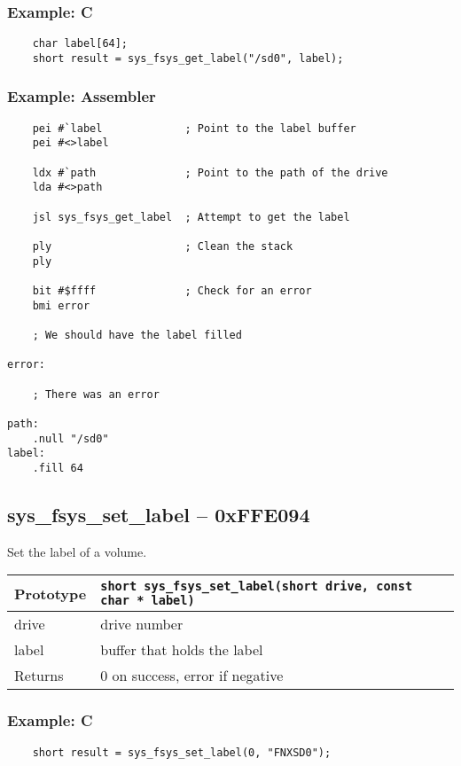\subsubsection*{Example: C}
\begin{lstlisting}
    char label[64];
    short result = sys_fsys_get_label("/sd0", label);
\end{lstlisting}

\subsubsection*{Example: Assembler}
\begin{verbatim}
    pei #`label             ; Point to the label buffer
    pei #<>label

    ldx #`path              ; Point to the path of the drive
    lda #<>path

    jsl sys_fsys_get_label  ; Attempt to get the label

    ply                     ; Clean the stack
    ply

    bit #$ffff              ; Check for an error
    bmi error

    ; We should have the label filled

error:

    ; There was an error

path:
    .null "/sd0"
label:
    .fill 64
\end{verbatim}


\subsection*{sys\_fsys\_set\_label -- 0xFFE094}
Set the label of a volume.

\bigskip

\begin{tabular}{|l||l|} \hline
Prototype & \lstinline!short sys_fsys_set_label(short drive, const char * label)! \\ \hline
drive & drive number \\ \hline
label & buffer that holds the label \\ \hline
Returns & 0 on success, error if negative \\ \hline
\end{tabular}

\subsubsection*{Example: C}
\begin{lstlisting}
    short result = sys_fsys_set_label(0, "FNXSD0");
\end{lstlisting}

